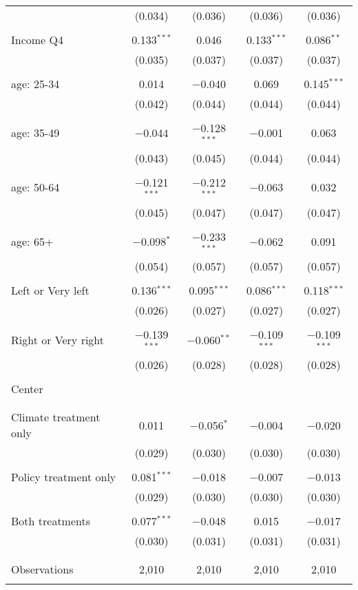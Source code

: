 \begin{tabular}{@{\extracolsep{5pt}}lcccc}
  & (0.034) & (0.036) & (0.036) & (0.036) \\ 
  & & & & \\ 
 Income Q4 & 0.133$^{***}$ & 0.046 & 0.133$^{***}$ & 0.086$^{**}$ \\ 
  & (0.035) & (0.037) & (0.037) & (0.037) \\ 
  & & & & \\ 
 age: 25-34 & 0.014 & $-$0.040 & 0.069 & 0.145$^{***}$ \\ 
  & (0.042) & (0.044) & (0.044) & (0.044) \\ 
  & & & & \\ 
 age: 35-49 & $-$0.044 & $-$0.128$^{***}$ & $-$0.001 & 0.063 \\ 
  & (0.043) & (0.045) & (0.044) & (0.044) \\ 
  & & & & \\ 
 age: 50-64 & $-$0.121$^{***}$ & $-$0.212$^{***}$ & $-$0.063 & 0.032 \\ 
  & (0.045) & (0.047) & (0.047) & (0.047) \\ 
  & & & & \\ 
 age: 65+ & $-$0.098$^{*}$ & $-$0.233$^{***}$ & $-$0.062 & 0.091 \\ 
  & (0.054) & (0.057) & (0.057) & (0.057) \\ 
  & & & & \\ 
 Left or Very left & 0.136$^{***}$ & 0.095$^{***}$ & 0.086$^{***}$ & 0.118$^{***}$ \\ 
  & (0.026) & (0.027) & (0.027) & (0.027) \\ 
  & & & & \\ 
 Right or Very right & $-$0.139$^{***}$ & $-$0.060$^{**}$ & $-$0.109$^{***}$ & $-$0.109$^{***}$ \\ 
  & (0.026) & (0.028) & (0.028) & (0.028) \\ 
  & & & & \\ 
 Center &  &  &  &  \\ 
  &  &  &  &  \\ 
  & & & & \\ 
 Climate treatment only & 0.011 & $-$0.056$^{*}$ & $-$0.004 & $-$0.020 \\ 
  & (0.029) & (0.030) & (0.030) & (0.030) \\ 
  & & & & \\ 
 Policy treatment only & 0.081$^{***}$ & $-$0.018 & $-$0.007 & $-$0.013 \\ 
  & (0.029) & (0.030) & (0.030) & (0.030) \\ 
  & & & & \\ 
 Both treatments & 0.077$^{***}$ & $-$0.048 & 0.015 & $-$0.017 \\ 
  & (0.030) & (0.031) & (0.031) & (0.031) \\ 
  & & & & \\ 
\hline \\[-1.8ex] 

Observations & 2,010 & 2,010 & 2,010 & 2,010 \\ 
\hline 
\hline \\[-1.8ex] 
\end{tabular} 